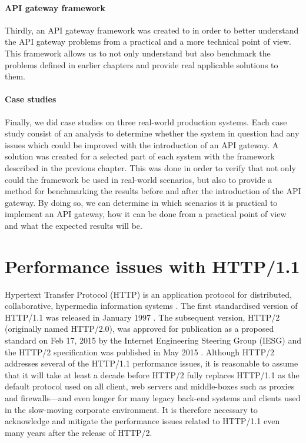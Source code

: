 \documentclass{cslthse-msc}
\begin{document}
\subsubsection{API gateway framework}
Thirdly, an API gateway framework was created to in order to better understand the API gateway problems from a practical and a more technical point of view. This framework allows us to not only understand but also benchmark the problems defined in earlier chapters and provide real applicable solutions to them.

\subsubsection{Case studies}
Finally, we did case studies on three real-world production systems. Each case study consist of an analysis to determine whether the system in question had any issues which could be improved with the introduction of an API gateway. A solution was created for a selected part of each system with the framework described in the previous chapter. This was done in order to verify that not only could the framework be used in real-world scenarios, but also to provide a method for benchmarking the results before and after the introduction of the API gateway. By doing so, we can determine in which scenarios it is practical to implement an API gateway, how it can be done from a practical point of view and what the expected results will be.

\chapter{Performance issues with HTTP/1.1}
Hypertext Transfer Protocol (HTTP) is an application protocol for distributed, collaborative, hypermedia information systems \cite{rfc2616}. The first standardised version of HTTP/1.1 was released in January 1997 \cite{rfc2616}. The subsequent version, HTTP/2 (originally named HTTP/2.0), was approved for publication as a proposed standard on Feb 17, 2015 by the Internet Engineering Steering Group (IESG) and the HTTP/2 specification was published in May 2015 \cite{rfc_7540}. Although HTTP/2 addresses several of the HTTP/1.1 performance issues, it is reasonable to assume that it will take at least a decade \cite[page 21]{hpbn2} before HTTP/2 fully replaces HTTP/1.1 as the default protocol used on all client, web servers and middle-boxes such as proxies and firewalls---and even longer for many legacy back-end systems and clients used in the slow-moving corporate environment. It is therefore necessary to acknowledge and mitigate the performance issues related to HTTP/1.1 even many years after the release of HTTP/2.
\end{document}
